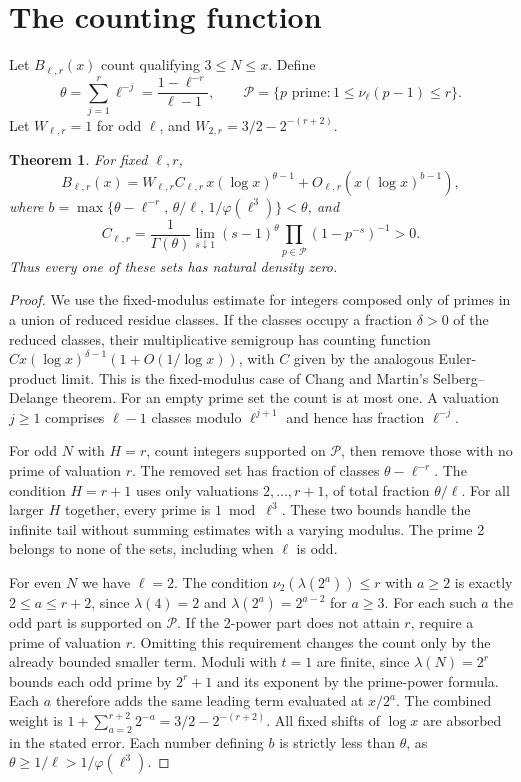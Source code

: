 \documentclass[11pt,letterpaper]{article}
\newtheorem{theorem}{Theorem}
\begin{document}
\section{The counting function}
Let \(B_{\ell,r}(x)\) count qualifying \(3\le N\le x\). Define
\[
 \theta=\sum_{j=1}^r\ell^{-j}=\frac{1-\ell^{-r}}{\ell-1},\qquad
 \mathcal P=\{p\text{ prime}:1\le\nu_\ell(p-1)\le r\}.
\]
Let \(W_{\ell,r}=1\) for odd \(\ell\), and \(W_{2,r}=3/2-2^{-(r+2)}\).
\begin{theorem}\label{th:asym}
For fixed \(\ell,r\),
\[
 B_{\ell,r}(x)=W_{\ell,r}C_{\ell,r}\,x(\log x)^{\theta-1}
       +O_{\ell,r}\!\left(x(\log x)^{b-1}\right),
\]
where \(b=\max\{\theta-\ell^{-r},\,\theta/\ell,\,1/\varphi(\ell^3)\}<\theta\), and
\[
 C_{\ell,r}=\frac1{\Gamma(\theta)}
 \lim_{s\downarrow1}(s-1)^\theta
       \prod_{p\in\mathcal P}(1-p^{-s})^{-1}>0.
\]
Thus every one of these sets has natural density zero.
\end{theorem}
\begin{proof}
We use the fixed-modulus estimate for integers composed only of primes in a union of reduced residue classes. If the classes occupy a fraction \(\delta>0\) of the reduced classes, their multiplicative semigroup has counting function \(C x(\log x)^{\delta-1}(1+O(1/\log x))\), with \(C\) given by the analogous Euler-product limit. This is the fixed-modulus case of Chang and Martin's Selberg--Delange theorem. For an empty prime set the count is at most one. A valuation \(j\ge1\) comprises \(\ell-1\) classes modulo \(\ell^{j+1}\) and hence has fraction \(\ell^{-j}\).

For odd \(N\) with \(H=r\), count integers supported on \(\mathcal P\), then remove those with no prime of valuation \(r\). The removed set has fraction of classes \(\theta-\ell^{-r}\). The condition \(H=r+1\) uses only valuations \(2,\ldots,r+1\), of total fraction \(\theta/\ell\). For all larger \(H\) together, every prime is \(1\bmod\ell^3\). These two bounds handle the infinite tail without summing estimates with a varying modulus. The prime 2 belongs to none of the sets, including when \(\ell\) is odd.

For even \(N\) we have \(\ell=2\). The condition \(\nu_2(\lambda(2^a))\le r\) with \(a\ge2\) is exactly \(2\le a\le r+2\), since \(\lambda(4)=2\) and \(\lambda(2^a)=2^{a-2}\) for \(a\ge3\). For each such \(a\) the odd part is supported on \(\mathcal P\). If the 2-power part does not attain \(r\), require a prime of valuation \(r\). Omitting this requirement changes the count only by the already bounded smaller term. Moduli with \(t=1\) are finite, since \(\lambda(N)=2^r\) bounds each odd prime by \(2^r+1\) and its exponent by the prime-power formula. Each \(a\) therefore adds the same leading term evaluated at \(x/2^a\). The combined weight is \(1+\sum_{a=2}^{r+2}2^{-a}=3/2-2^{-(r+2)}\). All fixed shifts of \(\log x\) are absorbed in the stated error. Each number defining \(b\) is strictly less than \(\theta\), as \(\theta\ge1/\ell>1/\varphi(\ell^3)\).
\end{proof}
\end{document}
